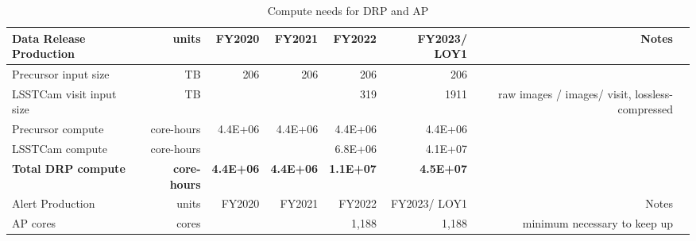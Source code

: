 \tiny \begin{longtable} { |p{}  |r  |r  |r  |r  |r  |r  |r |} 
\caption{Compute needs for DRP and AP \label{tab:drpAndAlertSizing}}\\ 
\hline 
\textbf{Data Release Production}&\textbf{units}&\textbf{FY2020}&\textbf{FY2021}&\textbf{FY2022}&\textbf{FY2023/ LOY1}&\textbf{Notes} \\ \hline
{Precursor input size}&{TB}&{206}&{206}&{206}&{206}& \\ \hline
{LSSTCam visit input size}&{TB}&{}&{}&{319}&{1911}&{raw images /  images/ visit, lossless-compressed} \\ \hline
{Precursor compute}&{core-hours}&{4.4E+06}&{4.4E+06}&{4.4E+06}&{4.4E+06}& \\ \hline
{LSSTCam compute}&{core-hours}&{}&{}&{6.8E+06}&{4.1E+07}& \\ \hline
\textbf{Total DRP compute}&\textbf{core-hours}&\textbf{4.4E+06}&\textbf{4.4E+06}&\textbf{1.1E+07}&\textbf{4.5E+07}& \\ \hline
{Alert Production}&{units}&{FY2020}&{FY2021}&{FY2022}&{FY2023/ LOY1}&{Notes} \\ \hline
{AP cores}&{cores}&{}&{}&{1,188}&{1,188}&{minimum necessary to keep up} \\ \hline
\end{longtable} \normalsize
